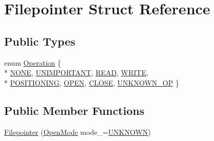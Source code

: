 \hypertarget{struct_filepointer}{\section{Filepointer Struct Reference}
\label{struct_filepointer}
}
\subsection*{Public Types}
\begin{DoxyCompactItemize}
\item 
enum \hyperlink{struct_filepointer_a953284a96849bec9523725cc803ca7a5}{Operation} \{ \\*
\hyperlink{struct_filepointer_a953284a96849bec9523725cc803ca7a5aaf3d4e30e45f68a8d760b92fda2d2f4d}{N\-O\-N\-E}, 
\hyperlink{struct_filepointer_a953284a96849bec9523725cc803ca7a5a49028762469cb294764a4a5f908ec8f6}{U\-N\-I\-M\-P\-O\-R\-T\-A\-N\-T}, 
\hyperlink{struct_filepointer_a953284a96849bec9523725cc803ca7a5ad443c670e74101df107853c56979fc24}{R\-E\-A\-D}, 
\hyperlink{struct_filepointer_a953284a96849bec9523725cc803ca7a5a85b050d955c2f0f96fd02a8be464ab70}{W\-R\-I\-T\-E}, 
\\*
\hyperlink{struct_filepointer_a953284a96849bec9523725cc803ca7a5aab380078acfd02052419cdb42d3c137a}{P\-O\-S\-I\-T\-I\-O\-N\-I\-N\-G}, 
\hyperlink{struct_filepointer_a953284a96849bec9523725cc803ca7a5a3f97a34bf4421205b53e935cc8b9034f}{O\-P\-E\-N}, 
\hyperlink{struct_filepointer_a953284a96849bec9523725cc803ca7a5ab89ce58b16794239ebfaa7992c32b2c7}{C\-L\-O\-S\-E}, 
\hyperlink{struct_filepointer_a953284a96849bec9523725cc803ca7a5a4a7aa8abac780f03f95134e8689bd9ce}{U\-N\-K\-N\-O\-W\-N\-\_\-\-O\-P}
 \}
\end{DoxyCompactItemize}
\subsection*{Public Member Functions}
\begin{DoxyCompactItemize}
\item 
\hyperlink{struct_filepointer_ab25364a5f037d915063a26c0cb7671a8}{Filepointer} (\hyperlink{checkio_8cpp_a3a70f8b621474c9885f80fe709e2dca2}{Open\-Mode} mode\-\_\-=\hyperlink{checkio_8cpp_a3a70f8b621474c9885f80fe709e2dca2a6ce26a62afab55d7606ad4e92428b30c}{U\-N\-K\-N\-O\-W\-N})
\end{DoxyCompactItemize}
